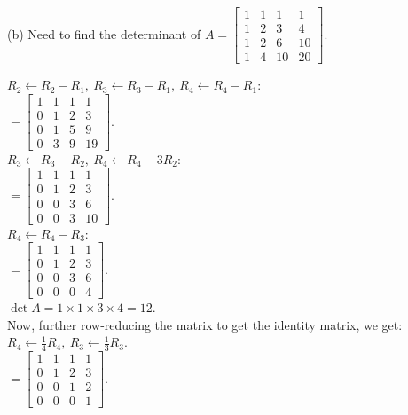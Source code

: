\documentclass[a4paper]{article}
\begin{document}
\begin{enumerate}
(b) Need to find the determinant of $A = \begin{bmatrix}1 & 1 & 1 & 1\\1 & 2 & 3 & 4\\1 & 2 & 6 & 10\\1 & 4 & 10 & 20\end{bmatrix}$.\\

\vspace{1in}

$R_2 \leftarrow R_2 - R_1,\ R_3 \leftarrow R_3 - R_1,\ R_4 \leftarrow R_4 - R_1$:\\
$= \begin{bmatrix}1 & 1 & 1 & 1\\0 & 1 & 2 & 3\\0 & 1 & 5 & 9\\0 & 3 & 9 & 19\end{bmatrix}$.\\

$R_3 \leftarrow R_3 - R_2,\ R_4 \leftarrow R_4 - 3R_2$:\\
$= \begin{bmatrix}1 & 1 & 1 & 1\\0 & 1 & 2 & 3\\0 & 0 & 3 & 6\\0 & 0 & 3 & 10\end{bmatrix}$.\\

$R_4 \leftarrow R_4 - R_3$:\\
$= \begin{bmatrix}1 & 1 & 1 & 1\\0 & 1 & 2 & 3\\0 & 0 & 3 & 6\\0 & 0 & 0 & 4\end{bmatrix}$.\\

$\det A = 1 \times 1 \times 3 \times 4 = 12$.\\
Now, further row-reducing the matrix to get the identity matrix, we get:\\

$R_4 \leftarrow \frac{1}{4} R_4,\ R_3 \leftarrow \frac{1}{3} R_3$.\\
$= \begin{bmatrix}1 & 1 & 1 & 1\\0 & 1 & 2 & 3\\0 & 0 & 1 & 2\\0 & 0 & 0 & 1\end{bmatrix}$.\\


\end{enumerate}
\end{document}
